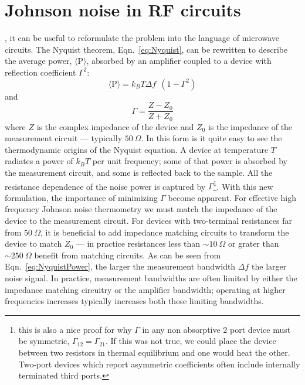 \section{Johnson noise in RF circuits}
, it can be useful to reformulate the problem into the language of microwave circuits. The Nyquist theorem, Eqn.~\ref{eq:Nyquist}, can be rewritten to describe the average power, $\langle\mathrm{P}\rangle$, absorbed by an amplifier coupled to a device with reflection coefficient $\Gamma^2$:
\begin{equation}\label{eq:NyquistPower}
\langle\mathrm{P}\rangle = k_BT\Delta f~~(1-\Gamma^2)
\end{equation}
and
\begin{equation}\label{eq:Gamma}
\Gamma = \frac{Z-Z_0}{Z+Z_0}
\end{equation}
where $Z$ is the complex impedance of the device and $Z_0$ is the impedance of the measurement circuit --- typically $50~\Omega$. In this form is it quite easy to see the thermodynamic origins of the Nyquist equation. A device at temperature $T$ radiates a power of $k_BT$ per unit frequency; some of that power is absorbed by the measurement circuit, and some is reflected back to the sample. All the resistance dependence of the noise power is captured by $\Gamma$\footnote{this is also a nice proof for why $\Gamma$ in any non absorptive 2 port device must be symmetric, $\Gamma_{12}=\Gamma_{21}$. If this was not true, we could place the device between two resistors in thermal equilibrium and one would heat the other. Two-port devices which report asymmetric coefficients often include internally terminated third ports.}.
With this new formulation, the importance of minimizing $\Gamma$ become apparent. For effective high frequency Johnson noise thermometry we must match the impedance of the device to the measurement circuit. For devices with two-terminal resistances far from $50~\Omega$, it is beneficial to add impedance matching circuits to transform the device to match $Z_0$ --- in practice resistances less than ${\sim}10~\Omega$ or grater than ${\sim}250~\Omega$ benefit from matching circuits.
As can be seen from Eqn.~\ref{eq:NyquistPower}, the larger the measurement bandwidth $\Delta f$ the larger noise signal. In practice, measurement bandwidths are often limited by either the impedance matching circuitry or the amplifier bandwidth; operating at higher frequencies increases typically increases both these limiting bandwidths.

